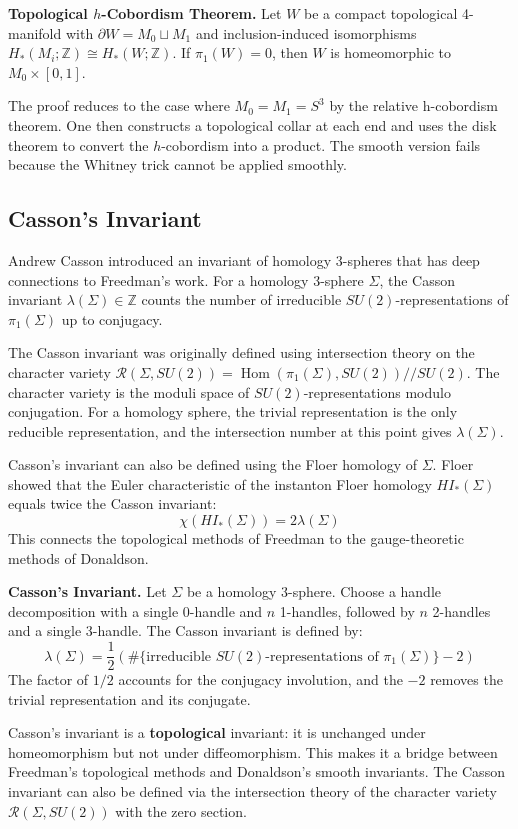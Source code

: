 \textbf{Topological $h$-Cobordism Theorem.} Let $W$ be a compact topological 4-manifold with $\partial W = M_0 \sqcup M_1$ and inclusion-induced isomorphisms $H_*(M_i;\mathbb{Z}) \cong H_*(W;\mathbb{Z})$. If $\pi_1(W) = 0$, then $W$ is homeomorphic to $M_0 \times [0,1]$.

The proof reduces to the case where $M_0 = M_1 = S^3$ by the relative h-cobordism theorem. One then constructs a topological collar at each end and uses the disk theorem to convert the $h$-cobordism into a product. The smooth version fails because the Whitney trick cannot be applied smoothly.

\subsection*{Casson's Invariant}

Andrew Casson introduced an invariant of homology 3-spheres that has deep connections to Freedman's work. For a homology 3-sphere $\Sigma$, the Casson invariant $\lambda(\Sigma) \in \mathbb{Z}$ counts the number of irreducible $SU(2)$-representations of $\pi_1(\Sigma)$ up to conjugacy.

The Casson invariant was originally defined using intersection theory on the character variety $\mathcal{R}(\Sigma, SU(2)) = \operatorname{Hom}(\pi_1(\Sigma), SU(2)) // SU(2)$. The character variety is the moduli space of $SU(2)$-representations modulo conjugation. For a homology sphere, the trivial representation is the only reducible representation, and the intersection number at this point gives $\lambda(\Sigma)$.

Casson's invariant can also be defined using the Floer homology of $\Sigma$. Floer showed that the Euler characteristic of the instanton Floer homology $HI_*(\Sigma)$ equals twice the Casson invariant:
\[
\chi(HI_*(\Sigma)) = 2\lambda(\Sigma)
\]
This connects the topological methods of Freedman to the gauge-theoretic methods of Donaldson.

\textbf{Casson's Invariant.} Let $\Sigma$ be a homology 3-sphere. Choose a handle decomposition with a single 0-handle and $n$ 1-handles, followed by $n$ 2-handles and a single 3-handle. The Casson invariant is defined by:
\[
\lambda(\Sigma) = \frac{1}{2}\left(\#\{\text{irreducible } SU(2)\text{-representations of } \pi_1(\Sigma)\} - 2\right)
\]
The factor of $1/2$ accounts for the conjugacy involution, and the $-2$ removes the trivial representation and its conjugate.

Casson's invariant is a \textbf{topological} invariant: it is unchanged under homeomorphism but not under diffeomorphism. This makes it a bridge between Freedman's topological methods and Donaldson's smooth invariants. The Casson invariant can also be defined via the intersection theory of the character variety $\mathcal{R}(\Sigma, SU(2))$ with the zero section.

